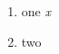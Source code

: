 \documentclass[11pt]{article}
\begin{document}
\begin{enumerate}\itemsep3pt\item one \emph{x}\item two\end{enumerate}
\end{document}
